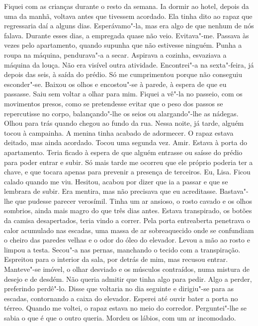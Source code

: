 Fiquei com as crianças durante o resto da semana. Ia dormir ao hotel,
depois da uma da manhã, voltava antes que tivessem acordado. Ela tinha
dito ao rapaz que regressaria daí a alguns dias. Esperávamo"-la, mas era
algo de que nenhum de nós falava. Durante esses dias, a empregada quase
não veio. Evitava"-me. Passava às vezes pelo apartamento, quando supunha
que não estivesse ninguém. Punha a roupa na máquina, pendurava"-a a
secar. Aspirava a cozinha, esvaziava a máquina da louça. Não era visível
outra atividade. Encontrei"-a na sexta"-feira, já depois das seis, à
saída do prédio. Só me cumprimentou porque não conseguiu esconder"-se.
Baixou os olhos e encostou"-se à parede, à espera de que eu passasse.
Saiu sem voltar a olhar para mim. Fiquei a vê"-la no passeio, com os
movimentos presos, como se pretendesse evitar que o peso dos passos se
repercutisse no corpo, balançando"-lhe os seios ou alargando"-lhe as
nádegas. Olhou para trás quando chegou ao fundo da rua. Nessa noite, já
tarde, alguém tocou à campainha. A menina tinha acabado de adormecer. O
rapaz estava deitado, mas ainda acordado. Tocou uma segunda vez. Amir.
Estava à porta do apartamento. Teria ficado à espera de que alguém
entrasse ou saísse do prédio para poder entrar e subir. Só mais tarde me
ocorreu que ele próprio poderia ter a chave, e que tocara apenas para
prevenir a presença de terceiros. Eu, Lisa. Ficou calado quando me viu.
Hesitou, acabou por dizer que ia a passar e que se lembrara de subir.
Era mentira, mas não precisava que eu acreditasse. Bastava"-lhe que
pudesse parecer verosímil. Tinha um ar ansioso, o rosto cavado e os
olhos sombrios, ainda mais magro do que três dias antes. Estava
transpirado, os botões da camisa desapertados, teria vindo a correr.
Pela porta entreaberta penetrava o calor acumulado nas escadas, uma
massa de ar sobreaquecido onde se confundiam o cheiro das paredes velhas
e o odor do óleo do elevador. Levou a mão ao rosto e limpou a testa.
Secou"-a nas pernas, manchando o tecido com a transpiração. Espreitou
para o interior da sala, por detrás de mim, mas recusou entrar.
Manteve"-se imóvel, o olhar desviado e os músculos contraídos, numa
mistura de desejo e de desdém. Não queria admitir que tinha algo para
pedir. Algo a perder, preferindo perdê"-lo. Disse que voltaria no dia
seguinte e dirigiu"-se para as escadas, contornando a caixa do elevador.
Esperei até ouvir bater a porta no térreo. Quando me voltei, o
rapaz estava no meio do corredor. Perguntei"-lhe se sabia o que é que o
outro queria. Mordeu os lábios, com um ar incomodado.


